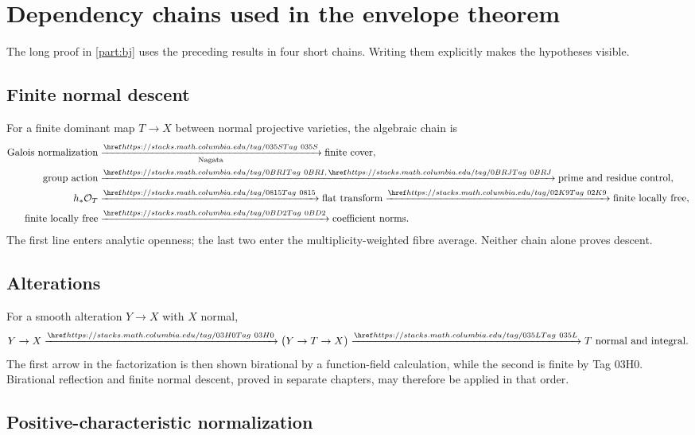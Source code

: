 \section{Dependency chains used in the envelope theorem}
\label{sec:stacks-dependency-chains}

The long proof in \cref{part:bj} uses the preceding results in four short chains.
Writing them explicitly makes the hypotheses visible.

\subsection*{Finite normal descent}
\label{sec:stacks-finite-normal-chain}

For a finite dominant map \(T\to X\) between normal projective varieties,
the algebraic chain is
\[
\begin{aligned}
\text{Galois normalization}
 &\xrightarrow[\text{Nagata}]{\stacktag{035S}}
 \text{finite cover},\\
\text{group action}
 &\xrightarrow{\stacktag{0BRI},\,\stacktag{0BRJ}}
 \text{prime and residue control},\\
h_*\mathcal O_T
 &\xrightarrow{\stacktag{0815}}
 \text{flat transform}
 \xrightarrow{\stacktag{02K9}}
 \text{finite locally free},\\
\text{finite locally free}
 &\xrightarrow{\stacktag{0BD2}}
 \text{coefficient norms}.
\end{aligned}
\]
The first line enters analytic openness; the last two enter the
multiplicity-weighted fibre average. Neither chain alone proves descent.

\subsection*{Alterations}
\label{sec:stacks-alteration-chain}

For a smooth alteration \(Y\to X\) with \(X\) normal,
\[
  Y\to X
  \xrightarrow{\stacktag{03H0}}
  \bigl(Y\to T\to X\bigr)
  \xrightarrow{\stacktag{035L}}
  T\text{ normal and integral}.
\]
The first arrow in the factorization is then shown birational by a
function-field calculation, while the second is finite by Tag 03H0.
Birational reflection and finite normal descent, proved in separate
chapters, may therefore be applied in that order.

\subsection*{Positive-characteristic normalization}
\label{sec:stacks-frobenius-chain}

